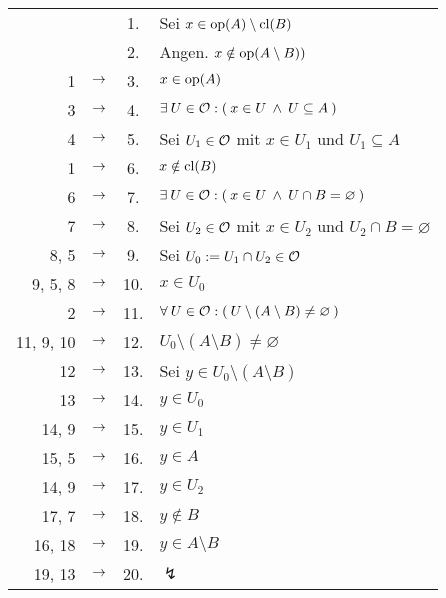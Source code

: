        \begin{longtable}{r c c l}
            & & 1. & Sei $x \in \text{op}(A) \setminus \text{cl}(B)$ \\
            & & 2. & Angen. $x \notin \text{op}(A \setminus B))$ \\
            1 & $\rightarrow$ & 3. & $x \in \text{op}(A)$ \\
            3 & $\rightarrow$ & 4. & $\exists\: U \in \mathcal{O} : (\: x \in U \:\land\: U \subseteq A \:)$ \\
            4 & $\rightarrow$ & 5. & Sei $U_1 \in \mathcal{O}$ mit $x \in U_1$ und $U_1 \subseteq A$ \\
            1 & $\rightarrow$ & 6. & $x \notin \text{cl}(B)$ \\
            6 & $\rightarrow$ & 7. & $\exists\: U \in \mathcal{O} : (\: x \in U \:\land\: U \cap B = \varnothing \:)$ \\
            7 & $\rightarrow$ & 8. & Sei $U_2 \in \mathcal{O}$ mit $x \in U_2$ und $U_2 \cap B = \varnothing$ \\
            8, 5 & $\rightarrow$ & 9. & Sei $U_0 := U_1 \cap U_2 \in \mathcal{O}$ \\
            9, 5, 8 & $\rightarrow$ & 10. & $x \in U_0$ \\
            2 & $\rightarrow$ & 11. & $\forall\: U \in \mathcal{O} : (\: U \setminus (A \setminus B) \neq \varnothing \:)$ \\
            11, 9, 10 & $\rightarrow$ & 12. & $U_0 \setminus (A \setminus B) \neq \varnothing$ \\
            12 & $\rightarrow$ & 13. & Sei $y \in U_0 \setminus (A \setminus B)$ \\
            13 & $\rightarrow$ & 14. & $y \in U_0$ \\
            14, 9 & $\rightarrow$ & 15. & $y \in U_1$ \\
            15, 5 & $\rightarrow$ & 16. & $y \in A$ \\
            14, 9 & $\rightarrow$ & 17. & $y \in U_2$ \\
            17, 7 & $\rightarrow$ & 18. & $y \notin B$ \\
            16, 18 & $\rightarrow$ & 19. & $y \in A \setminus B$ \\
            19, 13 & $\rightarrow$ & 20. & $\lightning$ \\
        \end{longtable}
        


